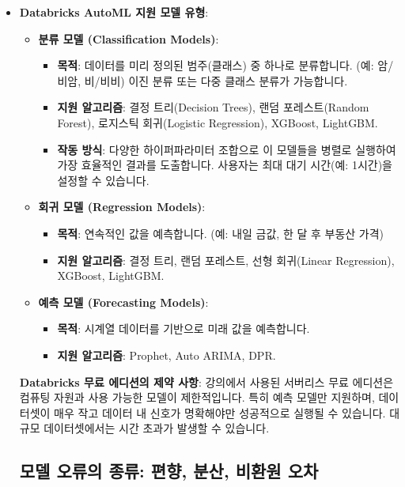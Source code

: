 \documentclass[11pt,a4paper]{article}
\theoremstyle{definition}
\begin{document}
\begin{itemize}
    \item \textbf{Databricks AutoML 지원 모델 유형}:
    \begin{itemize}
        \item \textbf{분류 모델 (Classification Models)}:
        \begin{itemize}
            \item \textbf{목적}: 데이터를 미리 정의된 범주(클래스) 중 하나로 분류합니다. (예: 암/비암, 비/비비) 이진 분류 또는 다중 클래스 분류가 가능합니다.
            \item \textbf{지원 알고리즘}: 결정 트리(Decision Trees), 랜덤 포레스트(Random Forest), 로지스틱 회귀(Logistic Regression), XGBoost, LightGBM.
            \item \textbf{작동 방식}: 다양한 하이퍼파라미터 조합으로 이 모델들을 병렬로 실행하여 가장 효율적인 결과를 도출합니다. 사용자는 최대 대기 시간(예: 1시간)을 설정할 수 있습니다.
        \end{itemize}
        \item \textbf{회귀 모델 (Regression Models)}:
        \begin{itemize}
            \item \textbf{목적}: 연속적인 값을 예측합니다. (예: 내일 금값, 한 달 후 부동산 가격)
            \item \textbf{지원 알고리즘}: 결정 트리, 랜덤 포레스트, 선형 회귀(Linear Regression), XGBoost, LightGBM.
        \end{itemize}
        \item \textbf{예측 모델 (Forecasting Models)}:
        \begin{itemize}
            \item \textbf{목적}: 시계열 데이터를 기반으로 미래 값을 예측합니다.
            \item \textbf{지원 알고리즘}: Prophet, Auto ARIMA, DPR.
        \end{itemize}
    \end{itemize}

    \begin{warningbox}
        \textbf{Databricks 무료 에디션의 제약 사항}:
        강의에서 사용된 서버리스 무료 에디션은 컴퓨팅 자원과 사용 가능한 모델이 제한적입니다. 특히 예측 모델만 지원하며, 데이터셋이 매우 작고 데이터 내 신호가 명확해야만 성공적으로 실행될 수 있습니다. 대규모 데이터셋에서는 시간 초과가 발생할 수 있습니다.
    \end{warningbox}

\newpage
\subsection*{모델 오류의 종류: 편향, 분산, 비환원 오차}


\end{itemize}
\end{document}
